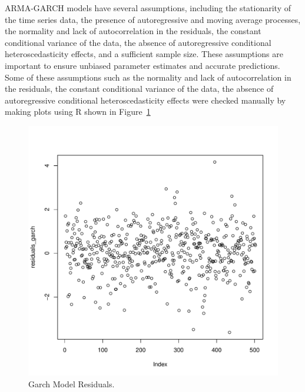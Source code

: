 \documentclass[12pt, letterpaper, titlepage]{article}
\newcommand{\jy}[1]{\textcolor{blue}{JY: #1}}
\begin{document}
ARMA-GARCH models have several assumptions, including the stationarity of the time series data, the presence of autoregressive and moving average processes, the normality and lack of autocorrelation in the residuals, the constant conditional variance of the data, the absence of autoregressive conditional heteroscedasticity effects, and a sufficient sample size. These assumptions are important to ensure unbiased parameter estimates and accurate predictions. Some of these assumptions such as the normality and lack of autocorrelation in the residuals, the constant conditional variance of the data, the absence of autoregressive conditional heteroscedasticity effects were checked manually by making plots using R shown in Figure~\ref{fig:garchvar} 

\begin{figure}[tbp]
  \begin{center}
  \includegraphics[width=\textwidth]{../figures/fig4.pdf}
  \caption{Garch Model Residuals.}\label{fig:garchvar}
  \end{center}
\end{figure}



\end{document}
